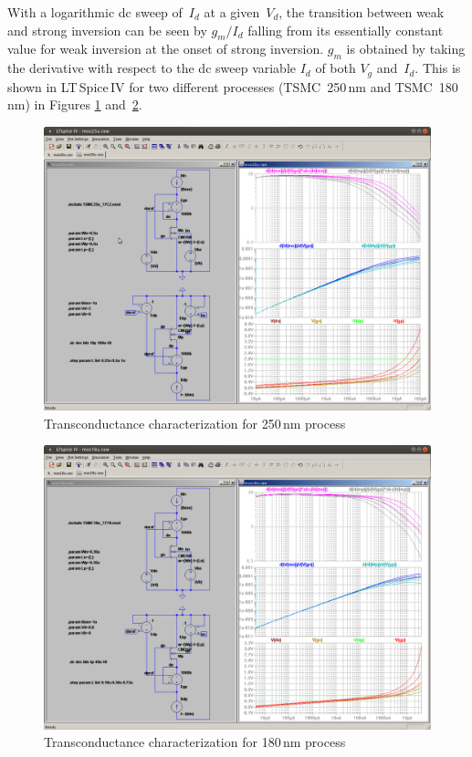 \documentclass[journal]{IEEEtran}
\begin{document}
With a logarithmic dc sweep of~$I_d$ at a given~$V_d$, the transition between weak and strong inversion can be seen by $g_m/I_d$ falling from its essentially constant value for weak inversion at the onset of strong inversion. 
$g_m$ is obtained by taking the derivative with respect to the dc sweep variable $I_d$ 
of both $V_g$ and~$I_d$.
This is shown in LT\,Spice\,IV for two different processes 
(TSMC~250\,nm and TSMC~180\,nm) in Figures \ref{fig:gm_mos25} and~\ref{fig:gm_mos18}. 

%
\begin{figure}[h]
\centering
\includegraphics[width=1.0\columnwidth]{figures/mos25u.pdf}
\caption{Transconductance characterization for 250\,nm process}
\label{fig:gm_mos25}
\end{figure}
%
\begin{figure}[h]
\centering
\includegraphics[width=1.0\columnwidth]{figures/mos18u.pdf}
\caption{Transconductance characterization for 180\,nm process}
\label{fig:gm_mos18}
\end{figure}
%
\end{document}
